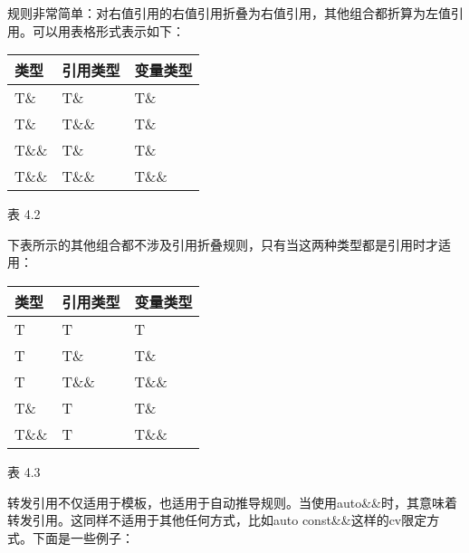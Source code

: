 规则非常简单：对右值引用的右值引用折叠为右值引用，其他组合都折算为左值引用。可以用表格形式表示如下：

\begin{table}[H]
\centering
	\begin{tabular}{|l|l|l|}
		\hline
		\textbf{类型} & \textbf{引用类型} & \textbf{变量类型} \\ \hline
		T\&           & T\&                        & T\&                       \\ \hline
		T\&           & T\&\&                      & T\&                       \\ \hline
		T\&\&         & T\&                        & T\&                       \\ \hline
		T\&\&         & T\&\&                      & T\&\&                     \\ \hline
	\end{tabular}
\end{table}

\begin{center}
表 4.2
\end{center}

下表所示的其他组合都不涉及引用折叠规则，只有当这两种类型都是引用时才适用：

\begin{table}[H]
\centering
	\begin{tabular}{|l|l|l|}
		\hline
		\textbf{类型} & \textbf{引用类型} & \textbf{变量类型} \\ \hline
		T             & T                          & T                         \\ \hline
		T             & T\&                        & T\&                       \\ \hline
		T             & T\&\&                      & T\&\&                     \\ \hline
		T\&           & T                          & T\&                       \\ \hline
		T\&\&         & T                          & T\&\&                     \\ \hline
	\end{tabular}
\end{table}

\begin{center}
表 4.3
\end{center}

转发引用不仅适用于模板，也适用于自动推导规则。当使用auto\&\&时，其意味着转发引用。这同样不适用于其他任何方式，比如auto const\&\&这样的cv限定方式。下面是一些例子：

